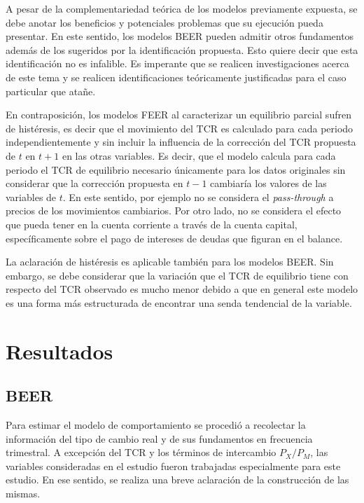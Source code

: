 \documentclass[12pt,letterpaper]{article}
\begin{document}
A pesar de la complementariedad teórica de los modelos previamente expuesta, se debe anotar los beneficios y potenciales problemas que su ejecución pueda presentar. En este sentido, los modelos BEER pueden admitir otros fundamentos además de los sugeridos por la identificación propuesta. Esto quiere decir que esta identificación no es infalible. Es imperante que se realicen investigaciones acerca de este tema y se realicen identificaciones teóricamente justificadas para el caso particular que atañe. 

En contraposición, los modelos FEER al caracterizar un equilibrio parcial sufren de histéresis, es decir que el movimiento del TCR es calculado para cada periodo independientemente y sin incluir la influencia de la corrección del TCR propuesta de $t$ en $t+1$ en las otras variables. Es decir, que el modelo calcula para cada periodo el TCR de equilibrio necesario únicamente para los datos originales sin considerar que la corrección propuesta en $t-1$ cambiaría los valores de las variables de $t$. En este sentido, por ejemplo no se considera el \emph{pass-through} a precios de los movimientos cambiarios. Por otro lado, no se considera el efecto que pueda tener en la cuenta corriente a través de la cuenta capital, específicamente sobre el pago de intereses de deudas que figuran en el balance.

La aclaración de histéresis es aplicable también para los modelos BEER. Sin embargo, se debe considerar que la variación que el TCR de equilibrio tiene con respecto del TCR observado es mucho menor debido a que en general este modelo es una forma más estructurada de encontrar una senda tendencial de la variable.

\section{Resultados}\label{calc}

\subsection*{BEER}
Para estimar el modelo de comportamiento se procedió a recolectar la información del tipo de cambio real y de sus fundamentos en frecuencia trimestral. A excepción del TCR y los términos de intercambio $P_X/P_M$, las variables consideradas en el estudio fueron trabajadas especialmente para este estudio. En ese sentido, se realiza una breve aclaración de la construcción de las mismas. 
\end{document}
